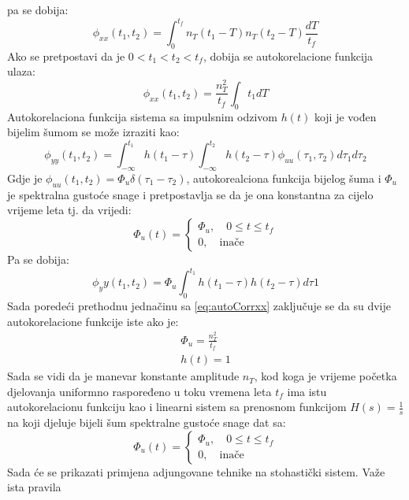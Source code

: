 pa se dobija:
\begin{equation}
    \phi_{xx}(t_1,t_2)=\int_{0}^{t_f}n_T(t_1-T)n_T(t_2-T)\frac{dT}{t_f}
\end{equation}
Ako se pretpostavi da je $0<t_1<t_2<t_f$, dobija se autokorelacione funkcija ulaza:
\begin{equation}
    \phi_{xx}(t_1,t_2)=\frac{n_T^2}{t_f}\int_{0}{t_1}dT
    \label{eq:autoCorrxx}
\end{equation}
Autokorelaciona funkcija sistema sa impulsnim odzivom $h(t)$ koji je vođen bijelim 
šumom se može izraziti kao:
\begin{equation}
    \phi_{yy}(t_1,t_2)=\int_{-\infty}^{t_1}h(t_1-\tau)\int_{-\infty}^{t_2}h(t_2-\tau)\phi_{uu}(\tau_1,\tau_2)d\tau_1d\tau_2
\end{equation}
Gdje je $\phi_{uu}(t_1,t_2)= \Phi_u\delta(\tau_1-\tau_2)$, autokorealciona funkcija bijelog šuma
i $\Phi_u$ je spektralna gustoće snage i pretpostavlja se da je ona konstantna za cijelo vrijeme leta tj. da vrijedi:
\begin{equation}
    \Phi_u(t) = \begin{cases}
        \Phi_u, \quad 0 \leq t \leq t_f \\
        0, \quad \text{inače} 
    \end{cases}
\end{equation}
Pa se dobija:
\begin{equation}
    \phi_yy(t_1,t_2) = \Phi_u\int_0^{t_1}h(t_1-\tau)h(t_2-\tau)d\tau1
\end{equation}
Sada poredeći prethodnu jednačinu sa \ref{eq:autoCorrxx} zaključuje se da 
su dvije autokorelacione funkcije iste ako je: 
\begin{eqnarray}
    \Phi_u =\frac{n_T^2}{t_f} \\
    h(t)=1
\end{eqnarray}
Sada se vidi da je manevar konstante amplitude $n_T$, kod koga je vrijeme 
početka djelovanja uniformno raspoređeno u toku vremena leta $t_f$ ima istu 
autokorelacionu funkciju kao i linearni sistem sa prenosnom funkcijom $H(s)=\frac{1}{s}$ 
na koji djeluje bijeli šum spektralne gustoće snage dat sa: 
\begin{equation*}
    \Phi_u(t) = \begin{cases}
        \Phi_u, \quad 0 \leq t \leq t_f \\
        0, \quad \text{inače}
    \end{cases}
\end{equation*}
Sada će se prikazati primjena adjungovane tehnike na stohastički sistem. Važe ista pravila 
